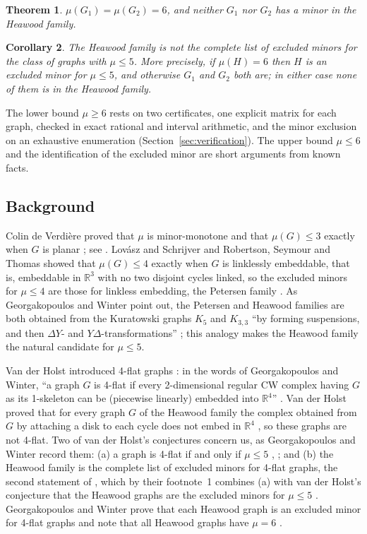 \documentclass[11pt]{article}
\newtheorem{theorem}{Theorem}
\newtheorem{corollary}[theorem]{Corollary}
\theoremstyle{remark}
\begin{document}
\begin{theorem}\label{thm:main}
$\mu(G_1)=\mu(G_2)=6$, and neither $G_1$ nor $G_2$ has a minor in the
Heawood family.
\end{theorem}

\begin{corollary}\label{cor:obstruction}
The Heawood family is not the complete list of excluded minors for the
class of graphs with $\mu\le5$. More precisely, if $\mu(H)=6$ then $H$
is an excluded minor for $\mu\le 5$, and otherwise $G_1$ and $G_2$ both
are; in either case none of them is in the Heawood family.
\end{corollary}

The lower bound $\mu\ge6$ rests on two certificates, one explicit matrix
for each graph, checked in exact rational and interval arithmetic, and
the minor exclusion on an exhaustive enumeration
(Section~\ref{sec:verification}). The upper bound $\mu\le6$ and the
identification of the excluded minor are short arguments from known
facts.

\subsection{Background}
Colin de Verdière proved that $\mu$ is minor-monotone and that $\mu(G)\le3$
exactly when $G$ is planar \cite{CdV}; see \cite[Theorem~2.4 and
1.4]{HLS}. Lovász and Schrijver \cite{LS} and Robertson, Seymour and
Thomas \cite{RST} showed that $\mu(G)\le4$ exactly when $G$ is linklessly
embeddable, that is, embeddable in $\mathbb{R}^3$ with no two disjoint
cycles linked, so the excluded minors for $\mu\le 4$ are those for linkless
embedding, the Petersen family \cite[1.4]{HLS}. As Georgakopoulos and
Winter point out, the Petersen and Heawood families are both obtained from
the Kuratowski graphs $K_5$ and $K_{3,3}$ ``by forming suspensions, and
then $\Delta Y$- and $Y\Delta$-transformations'' \cite[\S1.1]{GW}; this
analogy makes the Heawood family the natural candidate for $\mu\le5$.

Van der Holst introduced 4-flat graphs \cite{vdH}: in the words of
Georgakopoulos and Winter, ``a graph $G$ is 4-flat if every 2-dimensional
regular CW complex having $G$ as its 1-skeleton can be (piecewise
linearly) embedded into $\mathbb{R}^4$'' \cite[\S1]{GW}. Van der Holst
proved that for every graph $G$ of the Heawood family the complex obtained
from $G$ by attaching a disk to each cycle does not embed in
$\mathbb{R}^4$ \cite{vdH}, so these graphs are not 4-flat. Two of van der
Holst's conjectures concern us, as Georgakopoulos and Winter record them:
(a) a graph is 4-flat if and only if $\mu\le5$ \cite[Conjecture~3]{vdH},
\cite[Conjecture~1.4]{GW}; and (b) the Heawood family is the complete list
of excluded minors for 4-flat graphs, the second statement of
\cite[Conjecture~1.1]{GW}, which by their footnote~1 combines (a) with van
der Holst's conjecture that the Heawood graphs are the excluded minors for
$\mu\le5$ \cite[\S4]{vdH}. Georgakopoulos and Winter prove that each
Heawood graph is an excluded minor for 4-flat graphs
\cite[Theorem~6.1]{GW} and note that all Heawood graphs have $\mu=6$
\cite[\S1.1]{GW}.
\end{document}
